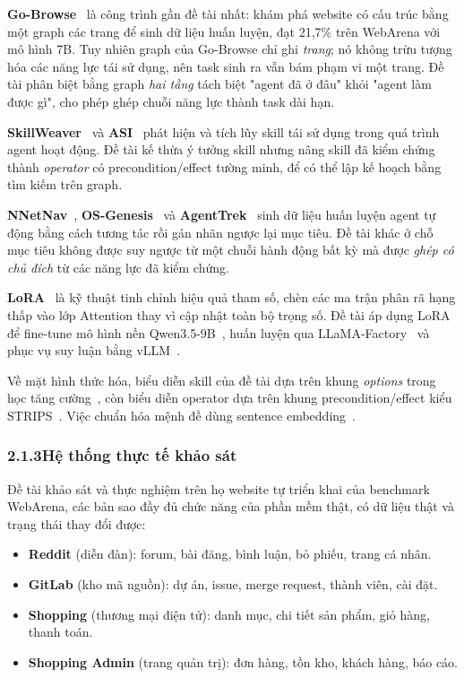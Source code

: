 \textbf{Go-Browse}~\cite{gandhi2026gobrowse} là công trình gần đề tài nhất:
khám phá website có cấu trúc bằng một graph các trang để sinh dữ liệu huấn
luyện, đạt 21,7\% trên WebArena với mô hình 7B. Tuy nhiên graph của Go-Browse
chỉ ghi \emph{trang}; nó không trừu tượng hóa các năng lực tái sử dụng, nên
task sinh ra vẫn bám phạm vi một trang. Đề tài phân biệt bằng graph
\emph{hai tầng} tách biệt "agent đã ở đâu" khỏi "agent làm được gì", cho phép
ghép chuỗi năng lực thành task dài hạn.

\textbf{SkillWeaver}~\cite{zheng2025skillweaver} và
\textbf{ASI}~\cite{wang2025asi} phát hiện và tích lũy skill tái sử dụng trong
quá trình agent hoạt động. Đề tài kế thừa ý tưởng skill nhưng nâng skill đã
kiểm chứng thành \emph{operator} có precondition/effect tường minh, để có thể
lập kế hoạch bằng tìm kiếm trên graph.

\textbf{NNetNav}~\cite{murty2024nnetnav}, \textbf{OS-Genesis}~\cite{sun2024osgenesis}
và \textbf{AgentTrek}~\cite{xu2024agenttrek} sinh dữ liệu huấn luyện agent tự
động bằng cách tương tác rồi gán nhãn ngược lại mục tiêu. Đề tài khác ở chỗ
mục tiêu không được suy ngược từ một chuỗi hành động bất kỳ mà được
\emph{ghép có chủ đích} từ các năng lực đã kiểm chứng.

\textbf{LoRA}~\cite{hu2022lora} là kỹ thuật tinh chỉnh hiệu quả tham số, chèn
các ma trận phân rã hạng thấp vào lớp Attention thay vì cập nhật toàn bộ trọng
số. Đề tài áp dụng LoRA để fine-tune mô hình nền
Qwen3.5-9B~\cite{yang2025qwen3}, huấn luyện qua
LLaMA-Factory~\cite{zheng2024llamafactory} và phục vụ suy luận bằng
vLLM~\cite{kwon2023vllm}.

Về mặt hình thức hóa, biểu diễn skill của đề tài dựa trên khung
\emph{options} trong học tăng cường~\cite{sutton1999options}, còn biểu diễn
operator dựa trên khung precondition/effect kiểu STRIPS~\cite{fikes1971strips}.
Việc chuẩn hóa mệnh đề dùng sentence embedding~\cite{reimers2019sbert}.

\subsubsection*{2.1.3\quad Hệ thống thực tế khảo sát}

Đề tài khảo sát và thực nghiệm trên họ website tự triển khai của benchmark
WebArena, các bản sao đầy đủ chức năng của phần mềm thật, có dữ liệu thật
và trạng thái thay đổi được:

\begin{itemize}
  \item \textbf{Reddit} (diễn đàn): forum, bài đăng, bình luận, bỏ phiếu,
  trang cá nhân.
  \item \textbf{GitLab} (kho mã nguồn): dự án, issue, merge request, thành
  viên, cài đặt.
  \item \textbf{Shopping} (thương mại điện tử): danh mục, chi tiết sản phẩm,
  giỏ hàng, thanh toán.
  \item \textbf{Shopping Admin} (trang quản trị): đơn hàng, tồn kho, khách
  hàng, báo cáo.
\end{itemize}

